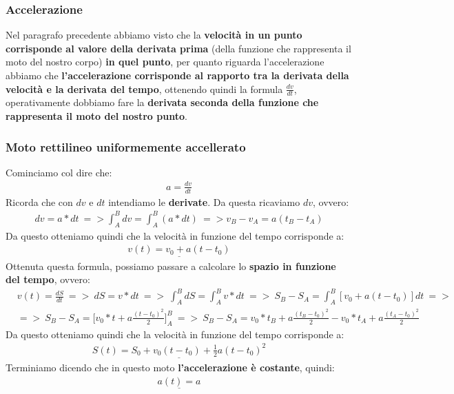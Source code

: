 		\subsubsection{Accelerazione}
			Nel paragrafo precedente abbiamo visto che la \textbf{velocità in un punto corrisponde al valore della derivata prima} (della funzione che rappresenta il moto del nostro corpo) \textbf{in quel punto}, per quanto riguarda l'accelerazione abbiamo che \textbf{l'accelerazione corrisponde al rapporto tra la derivata della velocità e la derivata del tempo}, ottenendo quindi la formula $\frac{dv}{dt}$, operativamente dobbiamo fare la \textbf{derivata seconda della funzione che rappresenta il moto del nostro punto}.

		\subsubsection{Moto rettilineo uniformemente accellerato}
			Cominciamo col dire che:
			\begin{align*}
				a=\frac{dv}{dt}
			\end{align*}
			Ricorda che con $dv$ e $dt$ intendiamo le \textbf{derivate}. Da questa ricaviamo $dv$, ovvero:
			\begin{align*}
				dv = a*dt\ => \int_A^B dv = \int_A^B (a*dt)\ => v_B-v_A = a(t_B-t_A)
			\end{align*}
			Da questo otteniamo quindi che la velocità in funzione del tempo corrisponde a:
			\begin{align*}
				\underline{v(t)=v_0+a(t-t_0)}
			\end{align*}
			Ottenuta questa formula, possiamo passare a calcolare lo \textbf{spazio in funzione del tempo}, ovvero:
			\begin{align*}
				&v(t) = \frac{dS}{dt}\ =>\ dS = v*dt\ =>\ \int_A^B dS = \int_A^B v*dt\ =>\ S_B-S_A = \int_A^B [v_0+a(t-t_0)] dt\ =>\ \\
				&=>\ S_B-S_A = \bigg[v_0*t+a\frac{(t-t_0)^2}{2}\bigg]_A^B\ =>\ S_B-S_A = v_0*t_B+a\frac{(t_B-t_0)^2}{2} - v_0*t_A+a\frac{(t_A-t_0)^2}{2}
			\end{align*}
			Da questo otteniamo quindi che la velocità in funzione del tempo corrisponde a:
			\begin{align*}
				\underline{S(t)=S_0+v_0(t-t_0)+\frac{1}{2}a(t-t_0)^2}
			\end{align*}
			Terminiamo dicendo che in questo moto \textbf{l'accelerazione è costante}, quindi:
			\begin{align*}
				\underline{a(t)= a}
			\end{align*}

